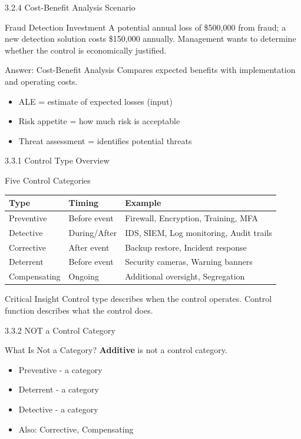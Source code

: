 \documentclass{beamer}
\begin{document}
	\begin{frame}{3.2.4 Cost-Benefit Analysis Scenario}
		\begin{block}{Fraud Detection Investment}
			A potential annual loss of \$500,000 from fraud; a new detection solution costs \$150,000 annually. Management wants to determine whether the control is economically justified.
		\end{block}
		\begin{exampleblock}{Answer: Cost-Benefit Analysis}
			Compares expected benefits with implementation and operating costs.
		\end{exampleblock}
		\begin{itemize}
			\item ALE = estimate of expected losses (input)
			\item Risk appetite = how much risk is acceptable
			\item Threat assessment = identifies potential threats
		\end{itemize}
	\end{frame}
	
	\begin{frame}{3.3.1 Control Type Overview}
		\begin{block}{Five Control Categories}
			\begin{tabular}{|p{2.5cm}|p{4cm}|p{4.5cm}|}
				\hline
				\textbf{Type} & \textbf{Timing} & \textbf{Example} \\
				\hline
				Preventive & Before event & Firewall, Encryption, Training, MFA \\
				\hline
				Detective & During/After & IDS, SIEM, Log monitoring, Audit trails \\
				\hline
				Corrective & After event & Backup restore, Incident response \\
				\hline
				Deterrent & Before event & Security cameras, Warning banners \\
				\hline
				Compensating & Ongoing & Additional oversight, Segregation \\
				\hline
			\end{tabular}
		\end{block}
		\begin{alertblock}{Critical Insight}
			Control type describes when the control operates. Control function describes what the control does.
		\end{alertblock}
	\end{frame}
	
	\begin{frame}{3.3.2 NOT a Control Category}
		\begin{block}{What Is Not a Category?}
			\textbf{Additive} is not a control category.
		\end{block}
		\begin{itemize}
			\item Preventive - a category
			\item Deterrent - a category
			\item Detective - a category
			\item Also: Corrective, Compensating
		\end{itemize}
	\end{frame}
	
\end{document}
